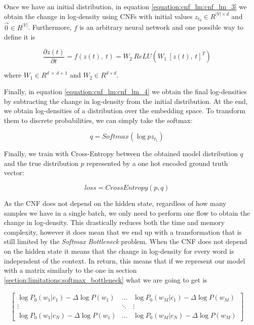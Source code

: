 Once we have an initial distribution, in equation \ref{equation:cnf_lm:cnf_lm_3} we obtain the change in log-density using CNFs with initial values $ z_{t_0} \in R^{|V| \times d}$ and $ \vec{0} \in R^{|V|} $. Furthermore, $ f $ is an arbitrary neural network and one possible way to define it is

\begin{displaymath}
    \frac{\partial z(t)}{\partial t} = f(z(t), \ t) = W_2 \ ReLU(W_1 \ [z(t), \ t]^T)
\end{displaymath}

where $ W_1 \in R^{d \ \times \ d+1} $ and $ W_2 \in R^{d \times d} $.

Finally, in equation \ref{equation:cnf_lm:cnf_lm_4} we obtain the final log-densities by subtracting the change in log-density from the initial distribution. At the end, we obtain log-densities of a distribution over the embedding space. To transform them to discrete probabilities, we can simply take the softmax:

\begin{displaymath}
    q = Softmax(\log pz_{t_1})    
\end{displaymath}

Finally, we train with Cross-Entropy between the obtained model distribution $ q $ and the true distribution $ p $ represented by a one hot encoded ground truth vector:

\begin{displaymath}
    loss = CrossEntropy(p, q)    
\end{displaymath}

As the CNF does not depend on the hidden state, regardless of how many samples we have in a single batch, we only need to perform one flow to obtain the change in log-density. This drastically reduces both the time and memory complexity, however it does mean that we end up with a transformation that is still limited by the \emph{Softmax Bottleneck} problem. When the CNF does not depend on the hidden state it means that the change in log-density for every word is independent of the context. In return, this means that if we represent our model with a matrix similarly to the one in section \ref{section:limitations:softmax_bottleneck} what we are going to get is

\begin{displaymath}
    \begin{matrix}
        \begin{bmatrix}
            \log P_0(w_1 | c_1) - \Delta \log P(w_1) & \hdots & \log P_0(w_M | c_1) - \Delta \log P(w_M)  \\
            \vdots & \ddots & \vdots \\
            \log P_0(w_1 | c_N) - \Delta \log P(w_1) & \hdots & \log P_0(w_M | c_N) - \Delta \log P(w_M)
        \end{bmatrix}
    \end{matrix}
\end{displaymath}

